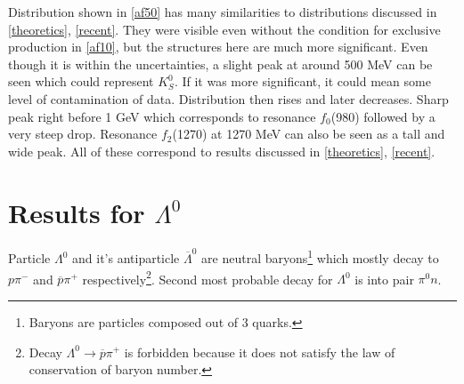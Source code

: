 Distribution shown in \autoref{af50} has many similarities to distributions discussed in \autoref{theoretics}, \autoref{recent}. They were visible even without the condition for exclusive production in \autoref{af10}, but the structures here are much more significant. Even though it is within the uncertainties, a slight peak at around 500 MeV can be seen which could represent $K^0_S$. If it was more significant, it could mean some level of contamination of data. Distribution then rises and later decreases. Sharp peak right before 1 GeV which corresponds to resonance $f_0$(980) followed by a very steep drop. Resonance $f_2$(1270) at 1270 MeV can also be seen as a tall and wide peak. All of these correspond to results discussed in \autoref{theoretics}, \autoref{recent}. 

\section{Results for $\Lambda^0$}
\label{Lambda}
Particle $\Lambda^0$ and it's antiparticle $\overline{\Lambda}^0$ are neutral baryons\footnote{Baryons are particles composed out of 3 quarks.} which mostly decay to $p \pi^-$ and $\overline{p} \pi^+$ respectively\footnote{Decay $\Lambda^0 \longrightarrow \overline{p} \pi^+$ is forbidden because it does not satisfy the law of conservation of baryon number.}. Second most probable decay for $\Lambda^0$ is into pair $\pi^0 n$.


